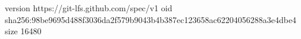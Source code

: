 version https://git-lfs.github.com/spec/v1
oid sha256:98be9695d488f3036da2f579b9043b4b387ec123658ac62204056288a3e4dbe4
size 16480
